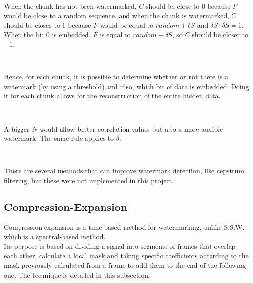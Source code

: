 ~

When the chunk has not been watermarked, $C$ should be close to $0$ because $F$ would be close to a random sequence, and when the chunk is watermarked, $C$ should be closer to $1$ because $F$ would be equal to $random + \delta S$ and $\delta S \cdot \delta S = 1$. When the bit 0 is embedded, $F$ is equal to $random - \delta S$, so $C$ should be closer to $-1$.

~

Hence, for each chunk, it is possible to determine whether or not there is a watermark (by using a threshold) and if so, which bit of data is embedded. Doing it for each chunk allows for the reconstruction of the entire hidden data.

~

A bigger $N$ would allow better correlation values but also a more audible watermark. The same rule applies to $\delta$.

~

There are several methods that can improve watermark detection, like cepstrum filtering, but these were not implemented in this project.

\subsection{Compression-Expansion}\cite{foo2010}

Compression-expansion is a time-based method for watermarking, unlike S.S.W. which is a spectral-based method.\\
Its purpose is based on dividing a signal into segments of frames that overlap each other, calculate a local mask and taking specific coefficients according to the mask previously calculated from a frame to add them to the end of the following one. The technique is detailed in this subsection.

